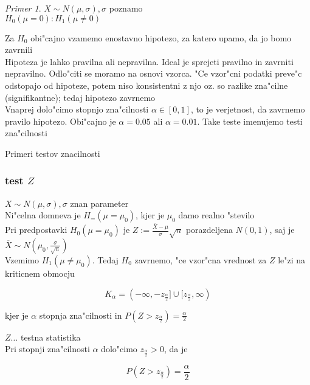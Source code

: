 \documentclass[a4paper,12pt]{article}
\theoremstyle{definition}
\theoremstyle{remark}
\newtheorem*{ex}{Primer}
\begin{document}
\begin{ex}
    $X \sim N(\mu, \sigma), \sigma$ poznamo \\
    $H_0(\mu = 0): H_1(\mu \neq 0)$
\end{ex}

Za $H_0$ obi"cajno vzamemo enostavno hipotezo, za katero upamo, da jo bomo zavrnili \\
Hipoteza je lahko pravilna ali nepravilna. Ideal je sprejeti pravilno in zavrniti nepravilno. Odlo"citi se
moramo na osnovi vzorca. "Ce vzor"cni podatki preve"c odstopajo od hipoteze, potem niso konsistentni z njo oz.
so razlike zna"cilne (signifikantne); tedaj hipotezo zavrnemo \\
Vnaprej dolo"cimo stopnjo zna"cilnosti $\alpha \in [0,1]$, to je verjetnost, da zavrnemo pravilo hipotezo.
Obi"cajno je $\alpha = 0.05$ ali $\alpha = 0.01$. Take teste imenujemo testi zna"cilnosti

Primeri testov znacilnosti

\subsubsection{test $Z$}

$X \sim N(\mu, \sigma), \sigma$ znan parameter \\
Ni"celna domneva je $H_=(\mu = \mu_0)$, kjer je $\mu_0$ damo realno "stevilo \\
Pri predpostavki $H_0(\mu = \mu_0)$ je $Z := \frac{\overline{X} - \mu}{\sigma} \sqrt{n}$ porazdeljena
$N(0,1)$, saj je $\overline{X} \sim N(\mu_0, \frac{\sigma}{\sqrt{n}})$ \\
Vzemimo $H_1(\mu \neq \mu_0)$. Tedaj $H_0$ zavrnemo, "ce vzor"cna vrednost za $Z$ le"zi na kriticnem obmocju

\begin{equation*}
    K_{\alpha} = (-\infty, -z_{\frac{\alpha}{2}}] \cup [z_{\frac{\alpha}{2}}, \infty)
\end{equation*}

kjer je $\alpha$ stopnja zna"cilnosti in $P(Z > z_{\frac{\alpha}{2}}) = \frac{\alpha}{2}$




$Z \dots$ testna statistika \\
Pri stopnji zna"cilnosti $\alpha$ dolo"cimo $z_{\frac{\alpha}{2}} > 0$, da je

\begin{equation*}
    P(Z > z_{\frac{\alpha}{2}}) = \frac{\alpha}{2}
\end{equation*}
\end{document}
